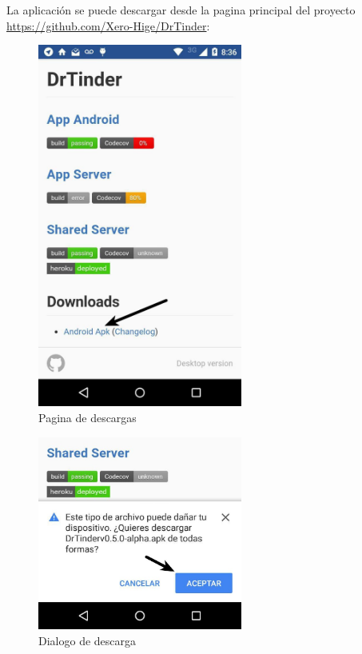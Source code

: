 \documentclass[10pt,letterpaper,extrafontsizes]{memoir}
\begin{document}
La aplicación se puede descargar desde la pagina principal del proyecto \href{https://github.com/Xero-Hige/DrTinder}{https://github.com/Xero-Hige/DrTinder}:\\


\begin{figure}[H]
    \centering
\includegraphics[width=0.6\textwidth]{graficos/capturas/a}
    \caption{Pagina de descargas}
    \label{fig:downloadPage}
\end{figure}

\begin{figure}[H]
    \centering
\includegraphics[width=0.6\textwidth]{graficos/capturas/c}
    \caption{Dialogo de descarga}
    \label{fig:downloaddiag}
\end{figure}
\end{document}
